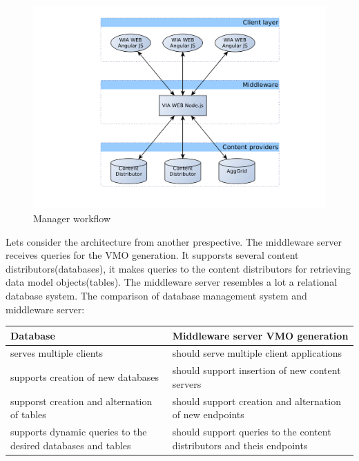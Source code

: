 \begin{figure}[h]
    \centering
	\includegraphics[width=\textwidth]{images/thesis_global_architecture_new.png}
    \caption{Manager workflow}
    \label{fig:arch_overview_new}
\end{figure}

Lets consider the architecture from another prespective.
The middleware server receives queries for the VMO generation. It supporsts several content distributors(databases), it makes queries to the content distributors for retrieving data model objects(tables). The middleware server resembles a lot a relational database system. The comparison of database management system and middleware server:

\begin{center}
  \begin{tabular}{||p{3in}|||p{3in}||}
    \hline
    Database & Middleware server VMO generation  \\ \hline
    serves multiple clients & should serve multiple client applications  \\ \hline
    supports creation of new databases & should support insertion of new content servers  \\ \hline
    supporst creation and alternation of tables & should support creation and alternation of new endpoints  \\ \hline
    supports dynamic queries to the desired databases and tables & should support queries to the content distributors and theis endpoints \\ \hline
    \hline
  \end{tabular}
\end{center}

